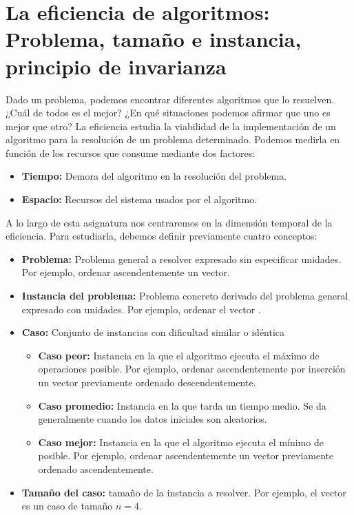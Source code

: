 \section{La eficiencia de algoritmos: Problema, tamaño e instancia, principio de invarianza}

Dado un problema, podemos encontrar diferentes algoritmos que lo resuelven.
¿Cuál de todos es el mejor?
¿En qué situaciones podemos afirmar que uno es mejor que otro?
La eficiencia estudia la viabilidad de la implementación de un algoritmo para la resolución de un problema determinado.
Podemos medirla en función de los recursos que consume mediante dos factores:

\begin{itemize}
	\item\textbf{Tiempo:} Demora del algoritmo en la resolución del problema.
	\item\textbf{Espacio:} Recursos del sistema usados por el algoritmo.
\end{itemize}

A lo largo de esta asignatura nos centraremos en la dimensión temporal de la eficiencia.
Para estudiarla, debemos definir previamente cuatro conceptos:

\begin{itemize}
	\item\textbf{Problema:} Problema general a resolver expresado sin especificar unidades. Por ejemplo, ordenar ascendentemente un vector.
	\item\textbf{Instancia del problema:} Problema concreto derivado del problema general expresado con unidades. Por ejemplo, ordenar el vector \code{[3,5,1,2]}.
	\item\textbf{Caso:} Conjunto de instancias con dificultad similar o idéntica
	\begin{itemize}
		\item\textbf{Caso peor:} Instancia en la que el algoritmo ejecuta el máximo de operaciones posible. Por ejemplo, ordenar ascendentemente por inserción un vector previamente ordenado descendentemente.
		\item\textbf{Caso promedio:} Instancia en la que tarda un tiempo medio. Se da generalmente cuando los datos iniciales son aleatorios.
		\item\textbf{Caso mejor:} Instancia en la que el algoritmo ejecuta el mínimo de posible. Por ejemplo, ordenar ascendentemente un vector previamente ordenado ascendentemente.
	\end{itemize}
	\item\textbf{Tamaño del caso:} tamaño de la instancia a resolver. Por ejemplo, el vector \code{[3,5,1,2]} es un caso de tamaño $n=4$.
\end{itemize}

